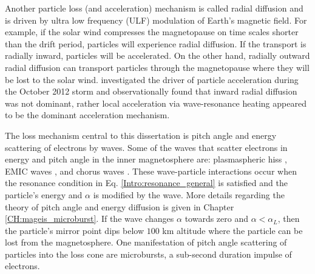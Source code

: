 Another particle loss (and acceleration) mechanism is called radial diffusion and is driven by ultra low frequency (ULF) modulation of Earth's magnetic field. For example, if the solar wind compresses the magnetopause on time scales shorter than the drift period, particles will experience radial diffusion. If the transport is radially inward, particles will be accelerated. On the other hand, radially outward radial diffusion can transport particles through the magnetopause where they will be lost to the solar wind. \citet{Reeves2013} investigated the driver of particle acceleration during the October 2012 storm and observationally found that inward radial diffusion was not dominant, rather local acceleration via wave-resonance heating appeared to be the dominant acceleration mechanism.

The loss mechanism central to this dissertation is pitch angle and energy scattering of electrons by waves. Some of the waves that scatter electrons in energy and pitch angle in the inner magnetosphere are: plasmaspheric hiss \citep[e.g.][]{O'Brien2014, Breneman2015}, EMIC waves \citep[e.g.][]{Hendry2017, Capannolo2019energetic}, and chorus waves \citep[e.g.][]{Breneman2017, Kasahara2018, Ozaki2019}. These wave-particle interactions occur when the resonance condition in Eq. \ref{Intro:resonance_general} is satisfied and the particle's energy and $\alpha$ is modified by the wave. More details regarding the theory of pitch angle and energy diffusion is given in Chapter \ref{CH:mageis_microburst}. If the wave changes $\alpha$ towards zero and $\alpha < \alpha_{L}$, then the particle's mirror point dips below $100$ km altitude where the particle can be lost from the magnetosphere. One manifestation of pitch angle scattering of particles into the loss cone are microbursts, a sub-second duration impulse of electrons.


